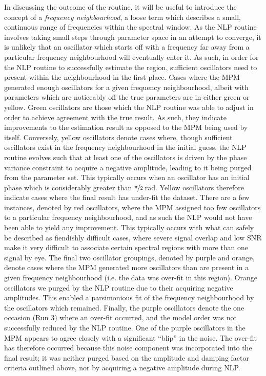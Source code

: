 In discussing the outcome of the routine, it will be useful to introduce the
concept of a \emph{frequency neighbourhood}, a loose term which describes a
small, continuous range of frequencies within the spectral window. As the
\ac{NLP} routine involves taking small steps
through parameter space in an attempt to converge, it is unlikely that an
oscillator which starts off with a frequency far away from a particular
frequency neighbourhood will eventually enter it. As such, in order for the
\ac{NLP} routine to successfully estimate the region, sufficient oscillators
need to present within the neighbourhood in the first place. Cases where the
\ac{MPM} generated enough oscillators for a given frequency neighbourhood,
albeit with parameters which are noticeably off the true parameters are in
either green or yellow. Green oscillators are those which the \ac{NLP} routine
was able to adjust in order to achieve agreement with the true result. As such,
they indicate improvements to the estimation result as opposed to the \ac{MPM}
being used by itself. Conversely, yellow oscillators denote cases where, though
sufficient oscillators exist in the frequency neighbourhood in the initial
guess, the \ac{NLP} routine evolves such that at least one of the oscillators
is driven by the phase variance constraint to acquire a negative amplitude,
leading to it being purged from the parameter set. This typically occurs when an
oscillator has an initial phase which is considerably greater than
$\nicefrac{\pi}{2}$\,\unit{\radian}.
Yellow oscillators therefore indicate cases where the final result has
under-fit the dataset. There are a few instances, denoted by red oscillators,
where the \ac{MPM} assigned too few oscillators to a particular frequency
neighbourhood, and as such the \ac{NLP} would not have been able to yield any
improvement. This typically occurs with what can safely be described as
fiendishly difficult cases, where severe signal overlap and low \ac{SNR} make
it very difficult to associate certain spectral regions with more than one
signal by eye.
The final two oscillator groupings, denoted by purple and orange, denote cases
where the \ac{MPM} generated more oscillators than are present in a given
frequency neighbourhood (i.e. the data was over-fit in this region). Orange
oscillators we purged by the \ac{NLP} routine due to their acquiring negative
amplitudes. This enabled a parsimonious fit of the frequency neighbourhood by
the oscillators which remained. Finally, the purple oscillators denote the one
occasion (Run 3) where an over-fit occurred, and the model order was not
successfully reduced by the \ac{NLP} routine. One of the purple oscillators in
the \ac{MPM} appears to agree closely with a significant ``blip'' in the noise.
The over-fit has therefore occurred because this noise component was
incorporated into the final result; it was neither purged based on the
amplitude and damping factor criteria outlined above, nor by acquiring a
negative amplitude during \ac{NLP}.

